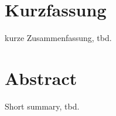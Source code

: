 \setcounter{page}{1}
\chapter*{\bfseries Kurzfassung} %
\thispagestyle{empty}

kurze Zusammenfassung, tbd.

\cleardoublepage

\chapter*{\bfseries Abstract} %
\thispagestyle{empty}

Short summary, tbd.

\cleardoublepage
